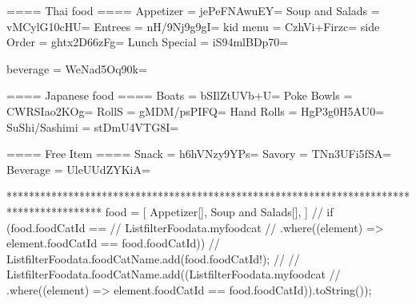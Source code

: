 ==== Thai food ====
Appetizer = jePeFNAwuEY=
Soup and Salads = vMCylG10cHU=
Entrees = nH/9Nj9g9gI=
kid menu = CzhVi+Firzc=
side Order = ghtx2D66zFg=
Lunch Special = iS94mlBDp70=


beverage = WeNad5Oq90k=


==== Japanese food ====
Boats = bSIlZtUVb+U=
Poke Bowls = CWRSIao2KOg=
RollS = gMDM/psPIFQ=
Hand Rolls = HgP3g0H5AU0=
SuShi/Sashimi = stDmU4VTG8I=

==== Free Item ====
Snack = h6hVNzy9YPs=
Savory = TNn3UFi5fSA=
Beverage = UleUUdZYKiA=


*****************************************************************************************
food = [
    Appetizer[],
    Soup and Salads[],
]
// if (food.foodCatId ==
      //     ListfilterFoodata.myfoodcat
      //         .where((element) => element.foodCatId == food.foodCatId)) {
      //   ListfilterFoodata.foodCatName.add(food.foodCatId!);
      // }
      // ListfilterFoodata.foodCatName.add((ListfilterFoodata.myfoodcat
      //     .where((element) => element.foodCatId == food.foodCatId)).toString());
